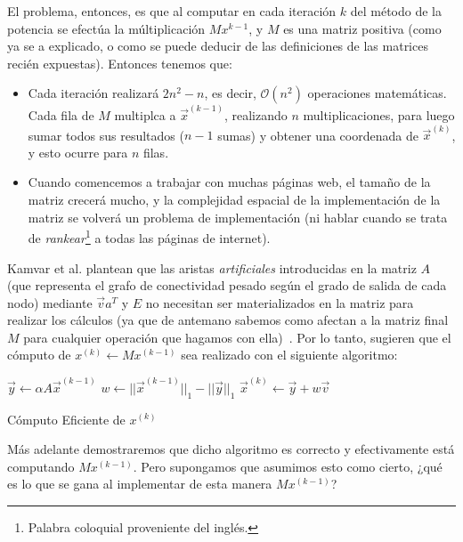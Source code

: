 \par El problema, entonces, es que al computar en cada iteraci\'on $k$ del
m\'etodo de la potencia se efect\'ua la m\'ultiplicaci\'on $Mx^{k-1}$, y $M$ es
una matriz positiva (como ya se a explicado, o como se puede deducir de las
definiciones de las matrices reci\'en expuestas). Entonces tenemos que:

\begin{itemize}
    \item Cada iteraci\'on realizar\'a $2n^2-n$, es decir, $\mathcal{O}(n^2)$
        operaciones matem\'aticas. Cada fila de $M$ multiplca a
        $\vec{x}^{(k-1)}$, realizando $n$ multiplicaciones, para luego sumar
        todos sus resultados ($n-1$ sumas) y obtener una coordenada de
        $\vec{x}^{(k)}$, y esto ocurre para $n$ filas.

    \item Cuando comencemos a trabajar con muchas p\'aginas web, el tama\~no de
        la matriz crecer\'a mucho, y la complejidad espacial de la
        implementaci\'on de la matriz se volver\'a un problema de
        implementaci\'on (ni hablar cuando se trata de
        \emph{rankear}\footnote{Palabra coloquial proveniente del ingl\'es.} a
        todas las p\'aginas de internet).
\end{itemize}
\medskip

\par Kamvar et al. plantean que las aristas \emph{artificiales} introducidas en
la matriz $A$ (que representa el grafo de conectividad pesado seg\'un el grado
de salida de cada nodo) mediante $\vec{v}a^T$ y $E$ no necesitan ser
materializados en la matriz para realizar los c\'alculos (ya que de antemano
sabemos como afectan a la matriz final $M$ para cualquier operaci\'on que
hagamos con ella)~\cite[p.262]{Kamvar2003}. Por lo tanto, sugieren que el
c\'omputo de $x^{(k)} \gets Mx^{(k-1)}$ sea realizado con el siguiente
algoritmo:

\begin{algorithm}
    $\vec{y} \gets \alpha A \vec{x}^{(k-1)}$\;
    $w \gets ||\vec{x}^{(k-1)}||_1 - ||\vec{y}||_1$\;
    $\vec{x}^{(k)}\gets \vec{y}+w\vec{v}$\;
    \caption{C\'omputo Eficiente de $x^{(k)}$\cite[p.262]{Kamvar2003}}
    \label{alg:power_method3}
\end{algorithm}

\par Más adelante demostraremos que dicho algoritmo es correcto y efectivamente
est\'a computando $Mx^{(k-1)}$. Pero supongamos que asumimos esto como cierto,
¿qu\'e es lo que se gana al implementar de esta manera $Mx^{(k-1)}$?

